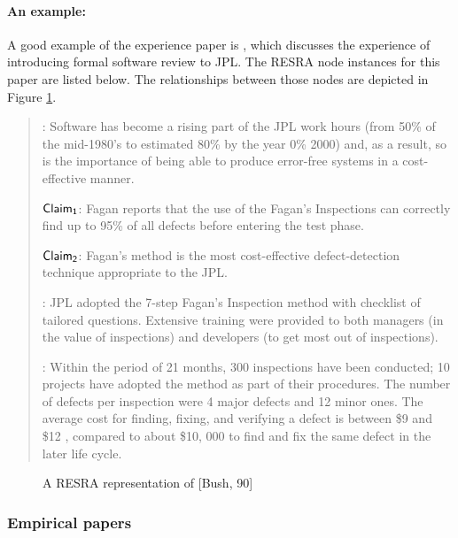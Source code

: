 \begin{itemize}
{\paragraph{An example:}

A good example of the experience paper is \cite{Bush90}, which discusses
the experience of introducing formal software review to JPL. The RESRA node
instances for this paper are listed below. The relationships between those
nodes are depicted in Figure \ref{fig:bush}.

\small
\begin{quotation}
  : Software has become a rising part of the JPL
  work hours (from 50\% of the mid-1980's to estimated 80\% by the year
  0\% 2000) and, as a result, so is the importance of being able to produce
  error-free systems in a cost-effective manner.
  
  \noindent \( {\sf Claim_{1}} \): Fagan reports that the use of the
  Fagan's Inspections can correctly find up to 95\% of all defects before
  entering the test phase.
  
  \noindent \( {\sf Claim_{2}} \): Fagan's method is the most
  cost-effective defect-detection technique appropriate to the JPL.
  
  : JPL adopted the 7-step Fagan's Inspection method
  with checklist of tailored questions. Extensive training were provided to
  both managers (in the value of inspections) and developers (to get most out
  of inspections).

  : Within the period of 21 months, 300 inspections
  have been conducted; 10 projects have adopted the method as part of their
  procedures. The number of defects per inspection were 4 major defects and
  12 minor ones. The average cost for finding, fixing, and verifying a
  defect is between \$9 and \$12 , compared to about \$10, 000 to find and
  fix the same defect in the later life cycle.
\end{quotation}
\normalsize

\begin{figure}[htb]
  \caption{A RESRA representation of [Bush, 90]}
  \label{fig:bush}
\end{figure}


\subsubsection{Empirical papers}

}
\end{itemize}

